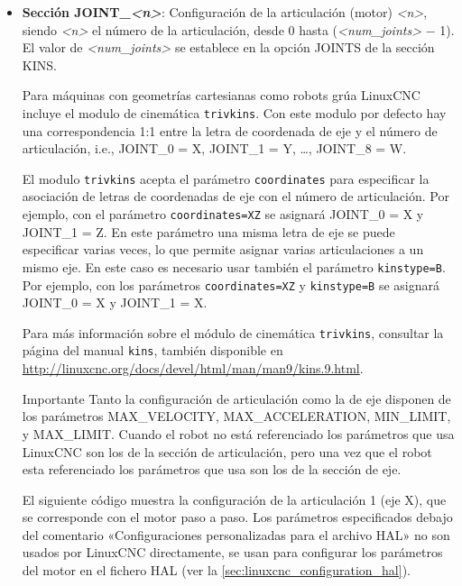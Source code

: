 \documentclass[english,spanish,a4paper,11pt]{article}
\begin{document}
\begin{itemize}

    \item \textbf{Sección JOINT\_\textit{<n>}}: Configuración de la articulación (motor) \textit{<n>}, siendo \textit{<n>} el número de la articulación, desde 0 hasta (\textit{<num\_joints>} $ - $ 1). El valor de \textit{<num\_joints>} se establece en la opción JOINTS de la sección KINS.

    Para máquinas con geometrías cartesianas como robots grúa LinuxCNC incluye el modulo de cinemática \texttt{trivkins}. Con este modulo por defecto hay una correspondencia 1:1 entre la letra de coordenada de eje y el número de articulación, i.e., JOINT\_0 = X, JOINT\_1 = Y, \dots, JOINT\_8 = W.
    
    El modulo \texttt{trivkins} acepta el parámetro \texttt{coordinates} para especificar la asociación de letras de coordenadas de eje con el número de articulación. Por ejemplo, con el parámetro \texttt{coordinates=XZ} se asignará JOINT\_0 = X y JOINT\_1 = Z.
    En este parámetro una misma letra de eje se puede especificar varias veces, lo que permite asignar varias articulaciones a un mismo eje. En este caso es necesario usar también el parámetro \texttt{kinstype=B}. Por ejemplo, con los parámetros \texttt{coordinates=XZ} y \texttt{kinstype=B} se asignará JOINT\_0 = X y JOINT\_1 = X.

    Para más información sobre el módulo de cinemática \texttt{trivkins}, consultar la página del manual \texttt{kins}, también disponible en \url{http://linuxcnc.org/docs/devel/html/man/man9/kins.9.html}.

    \begin{admonition}{Importante}
    Tanto la configuración de articulación como la de eje disponen de los parámetros MAX\_VELOCITY, MAX\_ACCELERATION, MIN\_LIMIT, y MAX\_LIMIT. Cuando el robot no está referenciado los parámetros que usa LinuxCNC son los de la sección de articulación, pero una vez que el robot esta referenciado los parámetros que usa son los de la sección de eje.
    \end{admonition}

    El siguiente código muestra la configuración de la articulación 1 (eje X), que se corresponde con el motor paso a paso. Los parámetros especificados debajo del comentario «Configuraciones personalizadas para el archivo HAL» no son usados por LinuxCNC directamente, se usan para configurar los parámetros del motor en el fichero HAL (ver la \cref{sec:linuxcnc_configuration_hal}).
    \medskip
    

\end{itemize}
\end{document}
